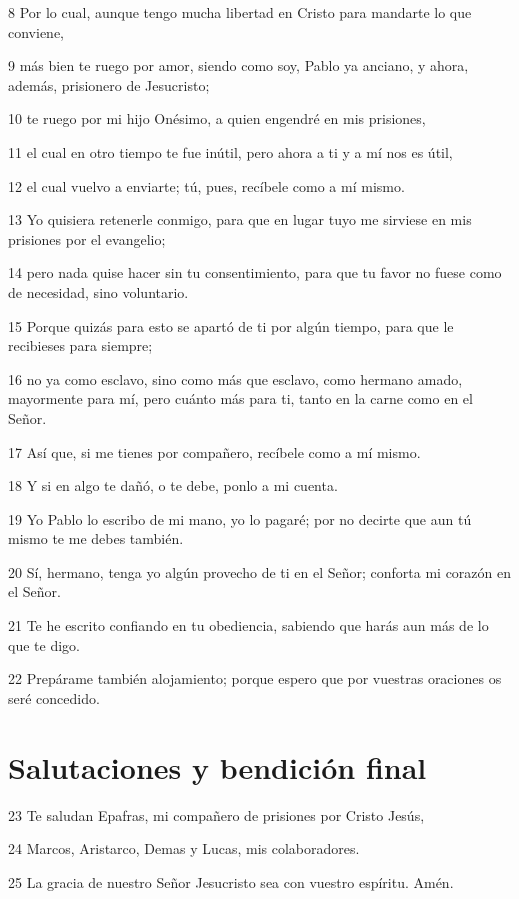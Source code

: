 \par 8 Por lo cual, aunque tengo mucha libertad en Cristo para mandarte lo que conviene,
\par 9 más bien te ruego por amor, siendo como soy, Pablo ya anciano, y ahora, además, prisionero de Jesucristo;
\par 10 te ruego por mi hijo Onésimo, a quien engendré en mis prisiones,
\par 11 el cual en otro tiempo te fue inútil, pero ahora a ti y a mí nos es útil,
\par 12 el cual vuelvo a enviarte; tú, pues, recíbele como a mí mismo.
\par 13 Yo quisiera retenerle conmigo, para que en lugar tuyo me sirviese en mis prisiones por el evangelio;
\par 14 pero nada quise hacer sin tu consentimiento, para que tu favor no fuese como de necesidad, sino voluntario.
\par 15 Porque quizás para esto se apartó de ti por algún tiempo, para que le recibieses para siempre;
\par 16 no ya como esclavo, sino como más que esclavo, como hermano amado, mayormente para mí, pero cuánto más para ti, tanto en la carne como en el Señor.
\par 17 Así que, si me tienes por compañero, recíbele como a mí mismo.
\par 18 Y si en algo te dañó, o te debe, ponlo a mi cuenta.
\par 19 Yo Pablo lo escribo de mi mano, yo lo pagaré; por no decirte que aun tú mismo te me debes también.
\par 20 Sí, hermano, tenga yo algún provecho de ti en el Señor; conforta mi corazón en el Señor.
\par 21 Te he escrito confiando en tu obediencia, sabiendo que harás aun más de lo que te digo.
\par 22 Prepárame también alojamiento; porque espero que por vuestras oraciones os seré concedido.

\section*{Salutaciones y bendición final}

\par 23 Te saludan Epafras, mi compañero de prisiones por Cristo Jesús,
\par 24 Marcos, Aristarco, Demas y Lucas, mis colaboradores.
\par 25 La gracia de nuestro Señor Jesucristo sea con vuestro espíritu. Amén.

